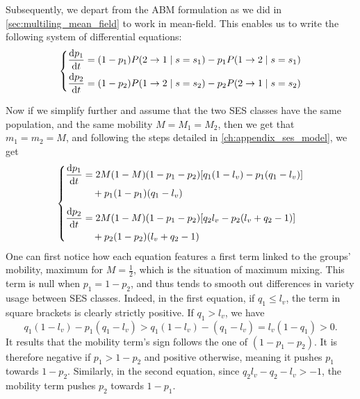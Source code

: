 \documentclass[../thesis.tex]{subfiles}
\begin{document}
Subsequently, we depart from the \ac{ABM} formulation as we did in
\cref{sec:multiling_mean_field} to work in mean-field. This enables us to write the
following system of differential equations:
\begin{equation}
    \label{eq:ses_ling_time_evol}
    \left\{
    \begin{aligned}
        \dv{p_1}{t} 
            &= (1 - p_1) P(2 \rightarrow 1 \mid s = s_1)
                - p_1 P(1 \rightarrow 2 \mid s = s_1)
        \\
        \dv{p_2}{t} 
            &= (1 - p_2) P(1 \rightarrow 2 \mid s = s_2)
                 - p_2 P(2 \rightarrow 1 \mid s = s_2)
    \end{aligned}
    \right.
\end{equation}

Now if we simplify further and assume that the two \ac{SES} classes have the same
population, and the same mobility $M = M_1 = M_2$, then we get that $m_1 = m_2 = M$, and
following the steps detailed in \cref{ch:appendix_ses_model}, we get
\begin{equation}
  \label{eq:ses_ling_time_evol_eq_mob}
  \left\{
  \begin{aligned}
      \dv{p_1}{t} 
          &=
            2 M (1 - M) (1 - p_1 - p_2) [q_1 (1 - l_v) - p_1 (q_1 - l_v)]
      \\
          & \quad +
            p_1 (1 - p_1) (q_1 - l_v)
      \\[1ex]
      \dv{p_2}{t} 
          &=
            2 M (1 - M) (1 - p_1 - p_2) [q_2 l_v - p_2 (l_v + q_2 - 1)]
      \\
          & \quad +
            p_2 (1 - p_2) (l_v + q_2 - 1)
  \end{aligned}
  \right.
\end{equation}
One can first notice how each equation features a first term linked to the groups'
mobility, maximum for $M = \frac{1}{2}$, which is the situation of maximum mixing. This
term is null when $p_1 = 1 - p_2$, and thus tends to smooth out differences in variety
usage between \ac{SES} classes. Indeed, in the first equation, if $q_1 \leq l_v$, the
term in square brackets is clearly strictly positive. If $q_1 > l_v$, we have
\begin{equation}
  q_1 (1 - l_v) - p_1 (q_1 - l_v) > q_1 (1 - l_v) - (q_1 - l_v) = l_v (1 - q_1) > 0.
\end{equation}
It results that the mobility term's sign follows the one of $(1 - p_1 - p_2)$. It is
therefore negative if $p_1 > 1 - p_2$ and positive otherwise, meaning it pushes $p_1$
towards $1 - p_2$. Similarly, in the second equation, since $q_2 l_v - q_2 - l_v > -1$,
the mobility term pushes $p_2$ towards $1 - p_1$.
\end{document}
